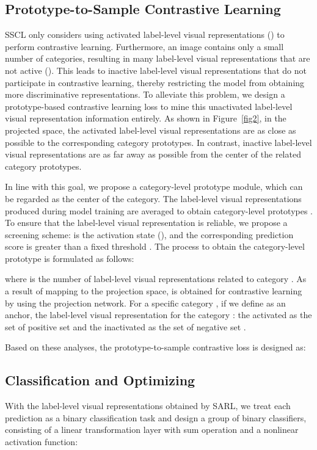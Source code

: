 \documentclass{ecai}
\begin{document}
\subsection{Prototype-to-Sample Contrastive Learning}
\label{PSCL}
SSCL only considers using activated label-level visual representations () to perform contrastive learning. Furthermore, an image contains only a small number of categories, resulting in many label-level visual representations that are not active ().
This leads to inactive label-level visual representations that do not participate in contrastive learning, thereby restricting the model from obtaining more discriminative representations.
To alleviate this problem, we design a prototype-based contrastive learning loss to mine this unactivated label-level visual representation information entirely. As shown in Figure~\ref{fig2}, in the projected space, the activated label-level visual representations are as close as possible to the corresponding category prototypes. In contrast, inactive label-level visual representations are as far away as possible from the center of the related category prototypes. 

In line with this goal, we propose a category-level prototype module, which can be regarded as the center of the category.
The label-level visual representations produced during model training are averaged to obtain category-level prototypes . 
To ensure that the label-level visual representation is reliable, we propose a screening scheme:  is the activation state (), and the corresponding prediction score is greater than a fixed threshold . 
The process to obtain the category-level prototype is formulated as follows:

where  is the number of label-level visual representations  related to category .
As a result of mapping  to the projection space,  is obtained for contrastive learning by using the projection network.
For a specific category , if we define  as an anchor, the label-level visual representation for the category : the activated  as the set of positive set  and the inactivated  as the set of negative set .

Based on these analyses, the prototype-to-sample contrastive loss is designed as:



\subsection{Classification and Optimizing}
With the label-level visual representations  obtained by SARL, we treat each  prediction as a binary classification task and design a group of binary classifiers, consisting of a linear transformation layer with sum operation and a nonlinear activation function:
\end{document}
